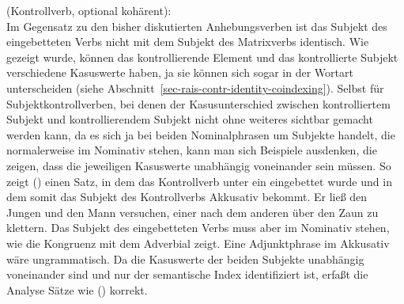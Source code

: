 {\eas
\label{le-versuchen-incoh}%
 (Kontrollverb, optional kohärent):\\
\onems{
cat$|$comps  \sliste{ NP[\type{str}]\ind{1}  } $\oplus$ \ibox{2} $\oplus$ \sliste{ \textrm{V[}%
\begin{tabular}[t]{@{}l@{}}
                                   \type{inf}, \textsc{subj} \sliste{NP[\type{str}]\ind{1}},\\
                                   \textsc{comps}~\ibox{2} ]:\ibox{3}\\
                                   \end{tabular}
         }\\
cont \ms[versuchen]{
        agens       & \ibox{1}\\
        soa & \ibox{3}\\
       }\\
}%
\zs
Im Gegensatz zu den bisher diskutierten Anhebungsverben ist das Subjekt des eingebetteten Verbs
nicht mit dem Subjekt des Matrixverbs identisch. Wie gezeigt wurde, können das kontrollierende
Element und das kontrollierte Subjekt verschiedene Kasuswerte haben, ja sie können sich sogar
in der Wortart unterscheiden (siehe Abschnitt~\ref{sec-rais-contr-identity-coindexing}).
Selbst für Subjektkontrollverben, bei denen der Kasusunterschied zwischen kontrolliertem
Subjekt und kontrollierendem Subjekt nicht ohne weiteres sichtbar gemacht werden kann, da
es sich ja bei beiden Nominalphrasen um Subjekte handelt, die normalerweise im Nominativ
stehen, kann man sich Beispiele ausdenken, die zeigen, dass die jeweiligen Kasuswerte
unabhängig voneinander sein müssen. So zeigt () einen Satz, in dem das Kontrollverb
unter ein \aciv eingebettet wurde und in dem somit das Subjekt des Kontrollverbs Akkusativ bekommt.
%
%
\ea
Er ließ den Jungen und den Mann versuchen, einer nach dem anderen über den Zaun zu klettern.
\z
Das Subjekt des eingebetteten Verbs muss aber im Nominativ stehen, wie die Kongruenz mit dem Adverbial zeigt.
Eine Adjunktphrase im Akkusativ wäre ungrammatisch. Da die Kasuswerte der beiden Subjekte unabhängig voneinander sind
und nur der semantische Index identifiziert ist, erfaßt die Analyse Sätze wie () korrekt.

}
